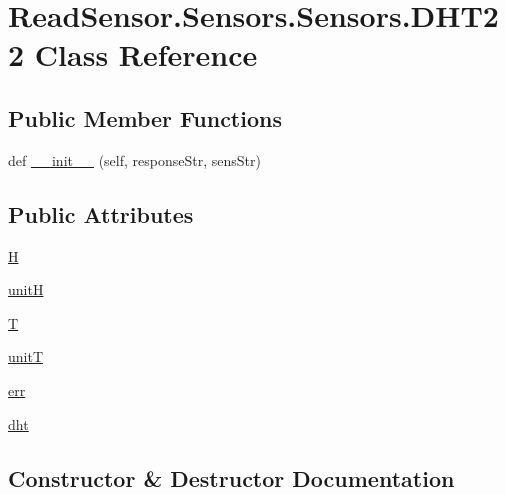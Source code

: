 \hypertarget{classReadSensor_1_1Sensors_1_1Sensors_1_1DHT22}{}\section{Read\+Sensor.\+Sensors.\+Sensors.\+D\+H\+T22 Class Reference}
\label{classReadSensor_1_1Sensors_1_1Sensors_1_1DHT22}
\subsection*{Public Member Functions}
\begin{DoxyCompactItemize}
\item 
def \hyperlink{classReadSensor_1_1Sensors_1_1Sensors_1_1DHT22_a12dd37e7cb97ca611f16556f101a2d24}{\+\_\+\+\_\+init\+\_\+\+\_\+} (self, response\+Str, sens\+Str)
\end{DoxyCompactItemize}
\subsection*{Public Attributes}
\begin{DoxyCompactItemize}
\item 
\hyperlink{classReadSensor_1_1Sensors_1_1Sensors_1_1DHT22_ae9fe17893df9d356384716d9f86d267a}{H}
\item 
\hyperlink{classReadSensor_1_1Sensors_1_1Sensors_1_1DHT22_a284bad74ab53470b1f545e961f55ebd9}{unitH}
\item 
\hyperlink{classReadSensor_1_1Sensors_1_1Sensors_1_1DHT22_a087acd6fb1be3705ffdebd1f47f68e14}{T}
\item 
\hyperlink{classReadSensor_1_1Sensors_1_1Sensors_1_1DHT22_aa8b6d62ac1d8e73b028450d233b0a9be}{unitT}
\item 
\hyperlink{classReadSensor_1_1Sensors_1_1Sensors_1_1DHT22_afc4c56711acfaf61daa10ebb40e06a61}{err}
\item 
\hyperlink{classReadSensor_1_1Sensors_1_1Sensors_1_1DHT22_a73a82cd752304cb8a532a41b1d2f49f6}{dht}
\end{DoxyCompactItemize}


\subsection{Constructor \& Destructor Documentation}
